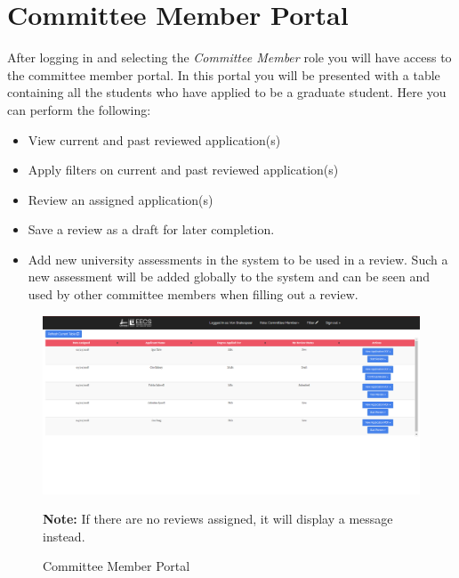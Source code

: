 \documentclass[fontsize=12pt,paper=letter,twoside]{scrartcl}
\begin{document}
\clearpage

\section{Committee Member Portal}

After logging in and selecting the \emph{Committee Member} role you will have access to the committee member portal. In this portal you will be presented with a table containing all the students who have applied to be a graduate student. Here you can perform the following:
\begin{itemize}
\item View current and past reviewed application(s)
\item Apply filters on current and past reviewed application(s)
\item Review an assigned application(s)
\item Save a review as a draft for later completion.
\item Add new university assessments in the system to be used in a review. Such a new assessment will be added globally to the system and can be seen and used by other committee members when filling out a review.
\end{itemize} 

\begin{figure}[!htb]
\begin{center}
\includegraphics[width=.8\textwidth]{images/default_table.png}
\end{center}
\caption{Committee Member Portal}
\label{fig:cm_portal}
\textbf{Note:} If there are no reviews assigned, it will display a message instead. 
\end{figure}

\newpage
\end{document}
